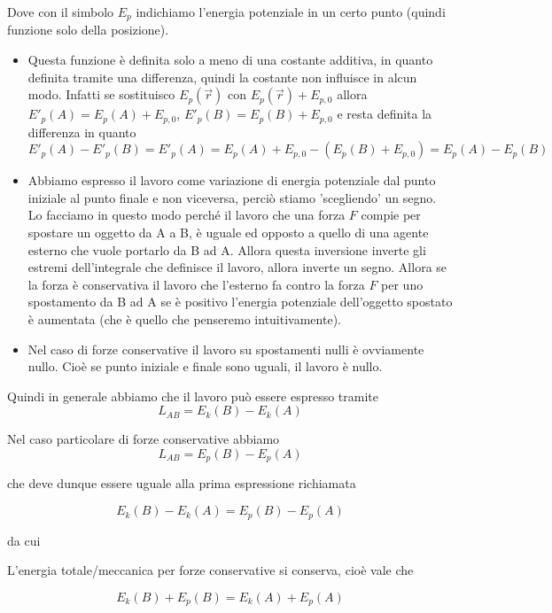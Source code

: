 Dove con il simbolo $E_p$ indichiamo l'energia potenziale in un certo punto (quindi funzione solo della posizione). 

\begin{itemize}
\item Questa funzione è definita solo a meno di una costante additiva, in quanto definita tramite una differenza, quindi la costante non influisce in alcun modo. Infatti se sostituisco $E_p (\vec{r})$ con $E_p (\vec{r})+E_{p,0} $ allora $E' _p (A)=E_p (A)+E_{p,0} $, $E' _p (B)=E_p (B)+E_{p,0} $ e resta definita la differenza in quanto 
$$E' _p (A) - E' _p (B)= E' _p (A)=E_p (A)+E_{p,0} -(E_p (B)+E_{p,0}) = E _p (A) - E _p (B)$$

\item Abbiamo espresso il lavoro come variazione di energia potenziale dal punto iniziale al punto finale e non viceversa, perciò stiamo 'scegliendo' un segno. Lo facciamo in questo modo perché il lavoro che una forza $F$ compie per spostare  un oggetto da A a B, è uguale ed opposto a quello di una agente esterno che vuole portarlo da B ad A. Allora questa inversione inverte gli estremi dell'integrale che definisce il lavoro, allora inverte un segno. Allora se la forza è conservativa il lavoro che l'esterno fa contro la forza $F$ per uno spostamento da B ad A se è positivo l'energia potenziale dell'oggetto spostato è aumentata (che è quello che penseremo intuitivamente).
\item Nel caso di forze conservative il lavoro su spostamenti nulli è ovviamente nullo. Cioè se punto iniziale e finale sono uguali, il lavoro è nullo.
\end{itemize}

Quindi in generale abbiamo che il lavoro può essere espresso tramite 
$$L_{AB}=E_k (B)- E_k (A)$$ 

Nel caso particolare di forze conservative abbiamo 
$$L_{AB}= E_p (B)- E_p (A)$$

che deve dunque essere uguale alla prima espressione richiamata

$$E_k (B)- E_k (A)= E_p (B)- E_p (A)$$ 

da cui 


\begin{proposizione}
	L'energia totale/meccanica per forze conservative si conserva, cioè vale che 
	
	$$E_k (B)+E_p (B)= E_k (A)+E_p (A)$$ 
\end{proposizione}

